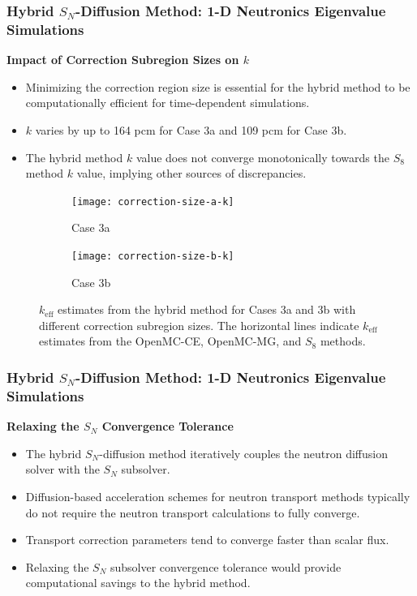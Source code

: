 \begin{frame}[noframenumbering]
  \frametitle{Hybrid $S_N$-Diffusion Method: 1-D Neutronics Eigenvalue Simulations}
  \textbf{Impact of Correction Subregion Sizes on $k$}
  \begin{itemize}
    \item Minimizing the correction region size is essential for the hybrid method to be
      computationally efficient for time-dependent simulations.
    \item $k$ varies by up to 164 pcm for Case 3a and 109 pcm for Case 3b.
    \item The hybrid method $k$ value does not converge monotonically towards the $S_8$ method $k$ value,
      implying other sources of discrepancies.
  \end{itemize}
  \begin{figure}[h]
    \centering
    \begin{subfigure}[b]{0.49\columnwidth}
      \centering
      \texttt{[image: correction-size-a-k]}
      \caption{Case 3a}
      \label{fig:v1-size-a-k}
    \end{subfigure}
    \hfill
    \begin{subfigure}[b]{0.49\columnwidth}
      \centering
      \texttt{[image: correction-size-b-k]}
      \caption{Case 3b}
      \label{fig:v1-size-b-k}
    \end{subfigure}
    \caption{$k_\text{eff}$ estimates from the hybrid method for Cases 3a and 3b with different
    correction subregion sizes. The horizontal lines indicate $k_\text{eff}$ estimates from the
    OpenMC-CE, OpenMC-MG, and $S_8$ methods.}
    \label{fig:v1-size-k}
  \end{figure}
\end{frame}

\begin{frame}[noframenumbering]
  \frametitle{Hybrid $S_N$-Diffusion Method: 1-D Neutronics Eigenvalue Simulations}
  \textbf{Relaxing the $S_N$ Convergence Tolerance}
  \begin{itemize}
    \item The hybrid $S_N$-diffusion method iteratively couples the neutron diffusion solver with
      the $S_N$ subsolver.
    \item Diffusion-based acceleration schemes for neutron transport methods typically do not
      require the neutron transport calculations to fully converge.
    \item Transport correction parameters tend to converge faster than scalar flux.
    \item Relaxing the $S_N$ subsolver convergence tolerance would provide computational savings to
      the hybrid method.
  \end{itemize}
\end{frame}

